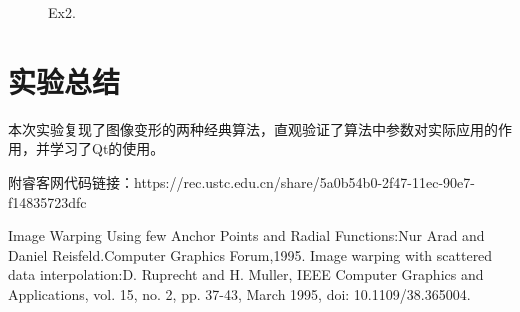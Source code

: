 \documentclass[12pt]{article}
\begin{document}
		\begin{figure}[H]
			\centering
			\centering
			\caption{Ex2.}
		\end{figure}
	
	
	
	\section{实验总结}
	本次实验复现了图像变形的两种经典算法，直观验证了算法中参数对实际应用的作用，并学习了Qt的使用。
	
	附睿客网代码链接：https://rec.ustc.edu.cn/share/5a0b54b0-2f47-11ec-90e7-f14835723dfc
	
	\begin{thebibliography}{99}
	
		Image Warping Using few Anchor Points and Radial Functions:Nur Arad and Daniel Reisfeld.Computer Graphics Forum,1995.
		Image warping with scattered data interpolation:D. Ruprecht and H. Muller, IEEE Computer Graphics and Applications, vol. 15, no. 2, pp. 37-43, March 1995, doi: 10.1109/38.365004.
	\end{thebibliography}
\end{document}
